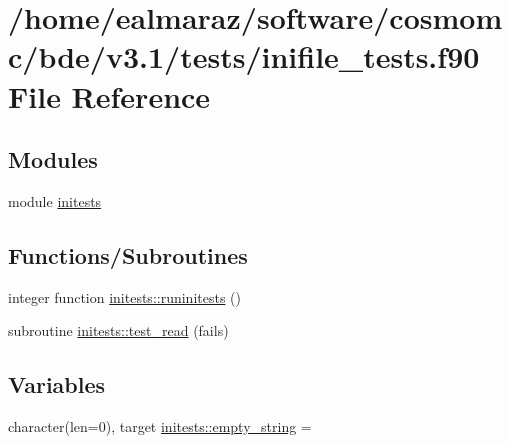 \hypertarget{inifile__tests_8f90}{}\section{/home/ealmaraz/software/cosmomc/bde/v3.1/tests/inifile\+\_\+tests.f90 File Reference}
\label{inifile__tests_8f90}
\subsection*{Modules}
\begin{DoxyCompactItemize}
\item 
module \mbox{\hyperlink{namespaceinitests}{initests}}
\end{DoxyCompactItemize}
\subsection*{Functions/\+Subroutines}
\begin{DoxyCompactItemize}
\item 
integer function \mbox{\hyperlink{namespaceinitests_ae612a57e2f1fcb5a2f8001fcb5259c62}{initests\+::runinitests}} ()
\item 
subroutine \mbox{\hyperlink{namespaceinitests_a0b26dd9f51d814267992b7a0b9bac310}{initests\+::test\+\_\+read}} (fails)
\end{DoxyCompactItemize}
\subsection*{Variables}
\begin{DoxyCompactItemize}
\item 
character(len=0), target \mbox{\hyperlink{namespaceinitests_a7c03c5dbd9ffd94ba170d586d799f467}{initests\+::empty\+\_\+string}} = \textquotesingle{}\textquotesingle{}
\end{DoxyCompactItemize}
